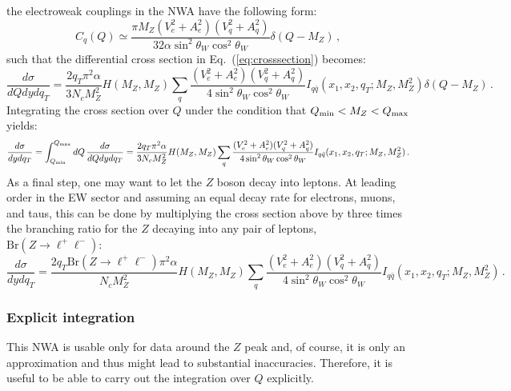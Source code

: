 \documentclass[10pt,a4paper]{article}
\begin{document}
the electroweak couplings in the NWA have the following form:
\begin{equation}\label{eq:partlead}
C_q(Q) \simeq \frac{\pi M_Z (V_e^2 + A_e^2)(V_q^2 + A_q^2) }{32 \alpha
  \sin^2\theta_W\cos^2\theta_W} \delta(Q-M_Z)\,,
\end{equation}
such that the differential cross section in
Eq.~(\ref{eq:crosssection}) becomes:
\begin{equation}
\frac{d\sigma}{dQ dy dq_T} =
\frac{2 q_T\pi^2\alpha}{3N_c M_Z^2} H(M_Z,M_Z) \sum_q \frac{(V_e^2 + A_e^2)(V_q^2 + A_q^2) }{
  4\sin^2\theta_W\cos^2\theta_W} I_{q\bar{q}}(x_1,x_2,q_T;M_Z,M_Z^2) \delta(Q-M_Z)\,.
\end{equation}
Integrating the cross section over $Q$ under the condition that
$Q_{\rm min}<M_Z<Q_{\rm max}$ yields:
\begin{equation}
\frac{d\sigma}{dy dq_T} = \int_{Q_{\rm min}}^{Q_{\rm max}}dQ\,\frac{d\sigma}{dQ dy dq_T} =
\frac{2 q_T\pi^2\alpha}{3N_c M_Z^2} H(M_Z,M_Z) \sum_q \frac{(V_e^2 + A_e^2)(V_q^2 + A_q^2) }{
  4\sin^2\theta_W\cos^2\theta_W} I_{q\bar{q}}(x_1,x_2,q_T;M_Z,M_Z^2)\,.
\end{equation}
As a final step, one may want to let the $Z$ boson decay into
leptons. At leading order in the EW sector and assuming an equal decay
rate for electrons, muons, and taus, this can be done by multiplying
the cross section above by three times the branching ratio for the $Z$
decaying into any pair of leptons,
$\mbox{Br}(Z\rightarrow \ell^+\ell^-)$:
\begin{equation}
\frac{d\sigma}{dy dq_T} = 
\frac{2 q_T \mbox{Br}(Z\rightarrow \ell^+\ell^-)\pi^2\alpha}{N_c M_Z^2} H(M_Z,M_Z) \sum_q \frac{(V_e^2 + A_e^2)(V_q^2 + A_q^2) }{
  4\sin^2\theta_W\cos^2\theta_W} I_{q\bar{q}}(x_1,x_2,q_T;M_Z,M_Z^2)\,.
\end{equation}


\subsubsection{Explicit integration}

This NWA is usable only for data around the $Z$ peak and, of course,
it is only an approximation and thus might lead to substantial
inaccuracies. Therefore, it is useful to be able to carry out the
integration over $Q$ explicitly.
\end{document}
